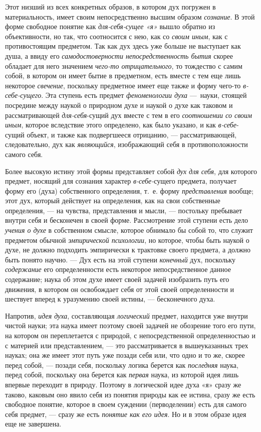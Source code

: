 \documentclass[twoside]{article}
\begin{document}
{Этот низший из всех конкретных образов, в котором дух погружен
в материальность, имеет своим непосредственно высшим образом
{\em сознание}. В этой
форме свободное понятие как
{\em для-себя-сущее «я»}
вышло обратно из объективности, но так, что соотносится с
нею, как со {\em своим иным},
как с противостоящим предметом. Так как дух здесь уже больше
не выступает как душа, а ввиду его
{\em самодостоверности
непосредственность бытия} скорее обладает для него значением
{\em чего-то отрицательного},
то тождество с самим собой, в котором он имеет бытие в
предметном, есть вместе с тем еще лишь некоторое
{\em свечение}, поскольку
предметное имеет еще также и форму чего-то
{\em в-себе-сущего}. Эта
ступень есть предмет {\em феноменологии
духа} —~науки, стоящей посредине между наукой о природном
духе и наукой о духе как таковом и рассматривающей
{\em для-себя}{}-сущий
дух вместе с тем в его {\em соотношении
со своим иным}, которое вследствие этого определено, как
было указано, и как
{\em в-себе}{}-сущий
объект, и также как подвергшееся отрицанию, —
рассматривающей, следовательно, дух как
{\em являющийся},
изображающий себя в противоположности самого себя.

Более высокую истину этой формы представляет собой
{\em дух для себя}, для
которого предмет, носящий для сознания характер
{\em в-себе-}сущего
предмета, получает форму его (духа) собственного определения, т.~е. форму
{\em представления}
вообще; этот дух, который действует на определения, как на
свои собственные определения, — на чувства, представления и
мысли, — постольку пребывает внутри себя и бесконечен в
своей форме. Рассмотрение этой ступени есть дело
{\em учения о духе} в
собственном смысле, которое обнимало бы собой то, что служит предметом
обычной {\em эмпирической психологии},
но которое, чтобы быть наукой о духе, не должно подходить
эмпирически к трактовке своего предмета, а должно быть понято научно. —
Дух есть на этой ступени
{\em конечный} дух,
поскольку {\em содержание}
его определенности есть некоторое непосредственное данное
содержание; наука об этом духе имеет своей задачей изобразить путь его
движения, в котором он освобождает себя от этой своей определенности и
шествует вперед к уразумению своей истины, — бесконечного
духа.

Напротив, {\em идея духа},
составляющая
{\em логический} предмет,
находится уже внутри чистой науки; эта наука имеет поэтому своей задачей не
обозрение того его пути, на котором он переплетается с природой, с
непосредственной определенностью и с материей или
представлением, — это рассматривается в вышеуказанных трех
науках; она же имеет этот путь уже позади себя или, что одно и то же,
скорее перед собой, — позади себя, поскольку логика берется
как {\em последняя}
наука, перед собой, поскольку она берется как
{\em первая} наука, из
которой идея лишь впервые переходит в природу. Поэтому в логической идее
духа «я» сразу же таково, каковым оно явило себя из понятия природы как ее
истина, сразу же есть свободное понятие, которое в своем суждении
(перводелении) есть для самого себя предмет, — сразу же есть
{\em понятие как его идея}.
Но и в этом образе идея еще не завершена.

}
\end{document}
